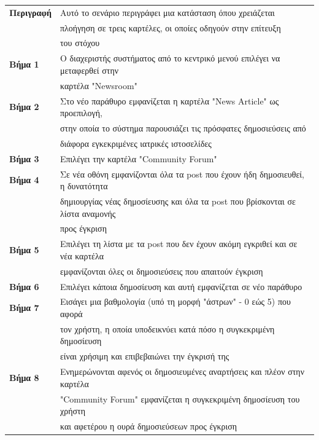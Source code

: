 \documentclass{article}
\newcommand\T{\rule{0pt}{2.6ex}}       %
\newcommand\B{\rule[-1.2ex]{0pt}{0pt}}
\begin{document}
  \begin{center}
     \begin{tabular}{|l|l|}
     \hline
      \textbf{Περιγραφή} & Αυτό το σενάριο περιγράφει μια κατάσταση όπου χρειάζεται \T \\& πλοήγηση σε τρεις καρτέλες, οι οποίες οδηγούν στην επίτευξη \\& του στόχου \B \\ 
      \hline
      \textbf{Βήμα 1} & Ο διαχεριστής συστήματος από το κεντρικό μενού επιλέγει να μεταφερθεί στην \T \\& καρτέλα "Newsroom" \B \\
      \hline
      \textbf{Βήμα 2} & Στο νέο παράθυρο εμφανίζεται η καρτέλα "News Article" ως προεπιλογή, \T \\& στην οποία το σύστημα παρουσιάζει τις πρόσφατες δημοσιεύσεις από \\& διάφορα εγκεκριμένες ιατρικές ιστοσελίδες \B \\
      \hline
      \textbf{Βήμα 3} & Επιλέγει την καρτέλα "Community Forum" \T\B \\
      \hline
      \textbf{Βήμα 4} & Σε νέα οθόνη εμφανίζονται όλα τα post που έχουν ήδη δημοσιευθεί, η δυνατότητα \T \\&  δημιουργίας νέας δημοσίευσης και όλα τα post που βρίσκονται σε λίστα αναμονής \\& προς έγκριση  \B \\
      \hline
      \textbf{Βήμα 5} & Επιλέγει τη λίστα με τα post που δεν έχουν ακόμη εγκριθεί και σε νέα καρτέλα  \T \\& εμφανίζονται όλες οι δημοσιεύσεις που απαιτούν έγκριση\B \\
      \hline
      \textbf{Βήμα 6} & Επιλέγει κάποια δημοσίευση και αυτή εμφανίζεται σε νέο παράθυρο  \T\B \\
      \hline
      \textbf{Βήμα 7} & Εισάγει μια βαθμολογία (υπό τη μορφή "άστρων" - 0 εώς 5) που αφορά \T \\& τον χρήστη, η οποία υποδεικνύει κατά πόσο η συγκεκριμένη δημοσίευση \\& είναι χρήσιμη και επιβεβαιώνει την έγκρισή της \B \\
      \hline
      \textbf{Βήμα 8} & Ενημερώνονται αφενός οι δημοσιευμένες αναρτήσεις και πλέον στην καρτέλα \T \\&  "Community Forum" εμφανίζεται η συγκεκριμένη δημοσίευση του χρήστη \\&  και αφετέρου η ουρά δημοσιεύσεων προς έγκριση\B \\
      \hline
     \end{tabular}
 \end{center}
 
\end{document}
